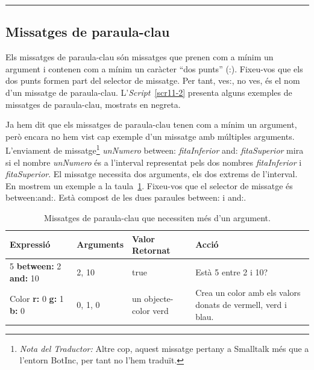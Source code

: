 \noindent
\rule{\textwidth}{2pt}

\subsection{Missatges de paraula-clau}
Els missatges de paraula-clau són missatges que prenen com a mínim un argument i contenen com a mínim un caràcter ``dos punts'' (:). Fixeu-vos que els dos punts formen part del selector de missatge. Per tant, \textsf{ves:}, no \textsf{ves}, és el nom d'un missatge de paraula-clau. L'\emph{Script}~\ref{scr11-2} presenta alguns exemples de missatges de paraula-clau, mostrats en negreta.

Ja hem dit que els missatges de paraula-clau tenen com a mínim un argument, però encara no hem vist cap exemple d'un missatge amb múltiples arguments. L'enviament de missatge\footnote{\emph{Nota del Traductor:} Altre cop, aquest missatge pertany a Smalltalk més que a l'entorn \textsf{BotInc}, per tant no l'hem traduït.} \textsf{{\itshape unNumero} between: {\itshape fitaInferior} and: {\itshape fitaSuperior}} mira si el nombre \textsf{{\itshape unNumero}} és a l'interval representat pels dos nombres \textsf{{\itshape fitaInferior}}  i \textsf{{\itshape fitaSuperior}}. El missatge necessita dos arguments, els dos extrems de l'interval. En mostrem un exemple a la taula~\ref{tab1103}. Fixeu-vos que el selector de missatge és \textsf{between:and:}. Està compost de les dues paraules  \textsf{between:} i \textsf{and:}.
\begin{table}[h]
\caption{Missatges de paraula-clau que necessiten més d'un argument.}
\label{tab1103}
\begin{center}
{\small \begin{tabular}{p{35mm}p{20mm}p{35mm}p{40mm}}
\hline
\textbf{Expressió} & \textbf{Arguments} & \textbf{Valor Retornat} & \textbf{Acció}\\
\hline
\textsf{5 {\bfseries between:} 2 {\bfseries and:} 10} & \textsf{2, 10} & \textsf{true} &
Està 5 entre 2 i 10?\\
\textsf{Color {\bfseries r:} 0 {\bfseries g:} 1 {\bfseries b:} 0} & \textsf{0, 1, 0} & un objecte-color verd &
Crea un color amb els valors donats de vermell, verd i blau.\\
\hline
\end{tabular}}
\end{center}
\end{table}

